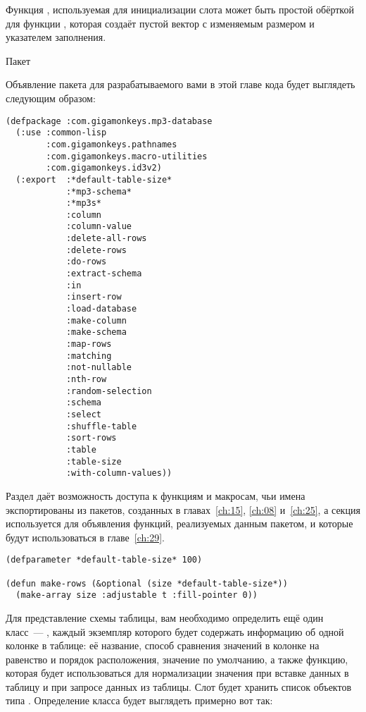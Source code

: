 Функция , используемая для инициализации слота  может быть
простой обёрткой для функции , которая создаёт пустой вектор с изменяемым
размером и указателем заполнения.

Пакет

Объявление пакета для разрабатываемого вами в этой главе кода будет выглядеть следующим образом:

\begin{lstlisting}
(defpackage :com.gigamonkeys.mp3-database
  (:use :common-lisp 
        :com.gigamonkeys.pathnames
        :com.gigamonkeys.macro-utilities
        :com.gigamonkeys.id3v2)
  (:export  :*default-table-size*
            :*mp3-schema*
            :*mp3s*
            :column
            :column-value
            :delete-all-rows
            :delete-rows
            :do-rows
            :extract-schema
            :in
            :insert-row
            :load-database
            :make-column
            :make-schema
            :map-rows
            :matching
            :not-nullable
            :nth-row
            :random-selection
            :schema
            :select
            :shuffle-table
            :sort-rows
            :table
            :table-size
            :with-column-values))
\end{lstlisting}

Раздел  даёт возможность доступа к функциям и макросам, чьи имена
экспортированы из пакетов, созданных в главах~\ref{ch:15}, \ref{ch:08} и~\ref{ch:25}, а
секция  используется для объявления функций, реализуемых данным пакетом, и
которые будут использоваться в главе~\ref{ch:29}.


\begin{lstlisting}
(defparameter *default-table-size* 100)

(defun make-rows (&optional (size *default-table-size*))
  (make-array size :adjustable t :fill-pointer 0))
\end{lstlisting}

Для представление схемы таблицы, вам необходимо определить ещё один класс~---
, каждый экземпляр которого будет содержать информацию об одной колонке в
таблице: её название, способ сравнения значений в колонке на равенство и порядок
расположения, значение по умолчанию, а также функцию, которая будет использоваться для
нормализации значения при вставке данных в таблицу и при запросе данных из таблицы. Слот
 будет хранить список объектов типа .  Определение класса будет
выглядеть примерно вот так:

